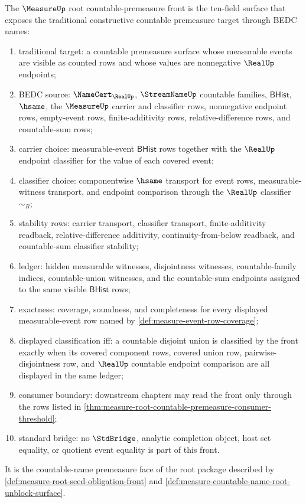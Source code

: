 \begin{definition}
\label{def:measure-root-countable-premeasure-front}
The $\MeasureUp$ root countable-premeasure front is the ten-field surface
that exposes the traditional constructive countable premeasure target through
BEDC names:
\begin{enumerate}
  \item traditional target: a countable premeasure surface whose measurable
  events are visible as counted rows and whose values are nonnegative
  $\RealUp$ endpoints;
  \item BEDC source: $\NameCert_{\RealUp}$, $\StreamNameUp$ countable
  families, $\mathsf{BHist}$, $\hsame$, the $\MeasureUp$ carrier and
  classifier rows, nonnegative endpoint rows, empty-event rows,
  finite-additivity rows, relative-difference rows, and countable-sum rows;
  \item carrier choice: measurable-event $\mathsf{BHist}$ rows together with
  the $\RealUp$ endpoint classifier for the value of each covered event;
  \item classifier choice: componentwise $\hsame$ transport for event rows,
  measurable-witness transport, and endpoint comparison through the
  $\RealUp$ classifier $\sim_R$;
  \item stability rows: carrier transport, classifier transport,
  finite-additivity readback, relative-difference additivity,
  continuity-from-below readback, and countable-sum classifier stability;
  \item ledger: hidden measurable witnesses, disjointness witnesses,
  countable-family indices, countable-union witnesses, and the countable-sum
  endpoints assigned to the same visible $\mathsf{BHist}$ rows;
  \item exactness: coverage, soundness, and completeness for every displayed
  measurable-event row named by \autoref{def:measure-event-row-coverage};
  \item displayed classification iff: a countable disjoint union is classified
  by the front exactly when its covered component rows, covered union row,
  pairwise-disjointness row, and $\RealUp$ countable endpoint comparison are
  all displayed in the same ledger;
  \item consumer boundary: downstream chapters may read the front only through
  the rows listed in
  \autoref{thm:measure-root-countable-premeasure-consumer-threshold};
  \item standard bridge: no $\StdBridge$, analytic completion object, host set
  equality, or quotient event equality is part of this front.
\end{enumerate}
It is the countable-name premeasure face of the root package described by
\autoref{def:measure-root-seed-obligation-front} and
\autoref{def:measure-countable-name-root-unblock-surface}.
\end{definition}

